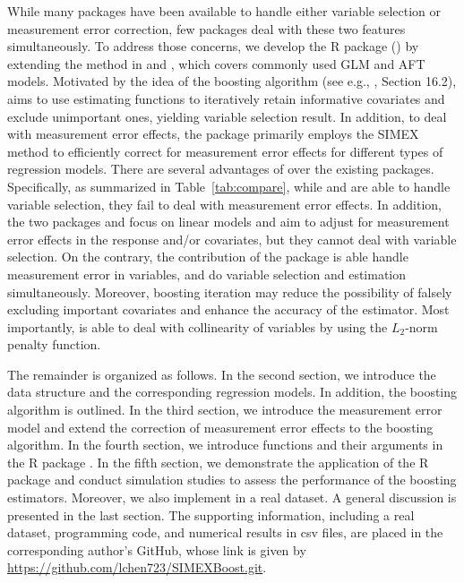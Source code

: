 While many packages have been available to handle either variable selection or measurement error correction, {few packages} deal with these two features simultaneously. To address those concerns, we develop the R package  (\citealp{SIMEXBoostR}) by extending the method in \cite{Chen:2023} and \cite{ChenQiu:2023}, which covers commonly used GLM and AFT models. Motivated by {the idea of} the boosting algorithm ({see} e.g., \citealp{Hastie:2008}, Section 16.2),    aims to {use} estimating functions to iteratively retain informative covariates and exclude unimportant ones, yielding variable selection result. In addition, to deal with measurement error effects, the package  primarily employs the SIMEX method to efficiently correct for measurement error effects for different types of regression models. {There are several advantages of  over the existing packages}. Specifically, as summarized in Table~\ref{tab:compare}, while  and  are able to handle variable selection, they fail to deal with measurement error effects. In addition, the two packages  and  focus on linear models and aim to adjust for measurement error effects in the response and/or covariates, but they cannot deal with variable selection. On the contrary, the contribution of the package  is able handle measurement error in variables, and do variable selection and estimation simultaneously. Moreover, boosting iteration may reduce the possibility of falsely excluding important covariates and enhance the accuracy of the estimator. Most importantly,   is able to deal with collinearity  of variables by using the $L_2$-norm penalty function.%


The remainder is organized as follows. In the second section, we introduce the data structure and the corresponding regression models. In addition, the boosting algorithm is outlined. In the  third section, we introduce the measurement error model and extend the correction of measurement error effects to the boosting algorithm. In the fourth section, we introduce functions and their arguments in the R package . In the fifth section, we demonstrate the application of the R package  and conduct simulation studies to assess the performance of the boosting estimators. Moreover, we also implement  in a real dataset. A general discussion is presented in the last section. The supporting information, including a real dataset, programming code, and numerical results in csv files, are placed in the corresponding author's GitHub, whose link is given by \url{https://github.com/lchen723/SIMEXBoost.git}.




